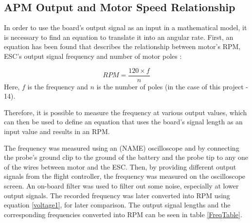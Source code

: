 \subsection{APM Output and Motor Speed Relationship}

In order to use the board's output signal as an input in a mathematical model, it is necessary to find an equation to translate it into an angular rate.
First, an equation has been found that describes the relationship between motor's RPM, ESC's output signal frequency and number of motor poles \cite{RPMEq}:

\begin{equation}
\label{voltage1}
	RPM = \frac{120\times f}{n}
\end{equation}
Here, $f$ is the frequency and $n$ is the number of poles (in the case of this project - 14).

Therefore, it is possible to measure the frequency at various output values, which can then be used to define an equation that uses the board's signal length as an input value and results in an RPM.

The frequency was measured using an (NAME) oscilloscope and by connecting the probe's ground clip to the ground of the battery and the probe tip to any one of the wires between motor and the ESC. Then, by providing different output signals from the flight controller, the frequency was measured on the oscilloscope screen. An on-board filter was used to filter out some noise, especially at lower output signals. The recorded frequency was later converted into RPM using equation \ref{voltage1}, for later comparison. The output signal lengths and the corresponding frequencies converted into RPM can be seen in table \ref{FreqTable}.

